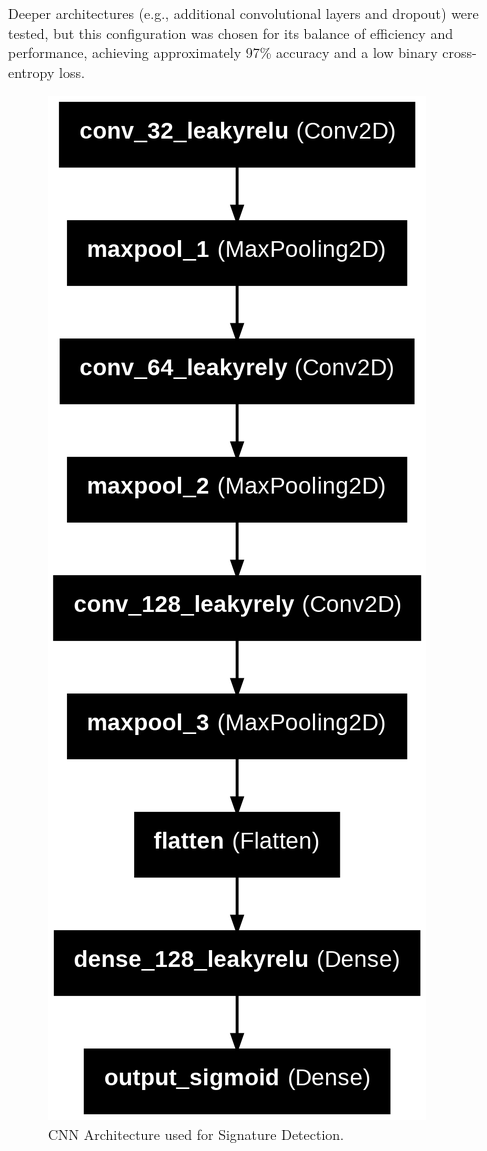 \documentclass[a4paper,12pt]{article}
\begin{document}
Deeper architectures (e.g., additional convolutional layers and dropout) were tested, but this configuration was chosen for its balance of efficiency and performance, achieving approximately 97\% accuracy and a low binary cross-entropy loss.
\begin{figure}[H]
    \centering
    \includegraphics[scale=0.17]{net.png}
    \caption{CNN Architecture used for Signature Detection.}
    \label{fig:cnn_architecture}
\end{figure}
\end{document}
